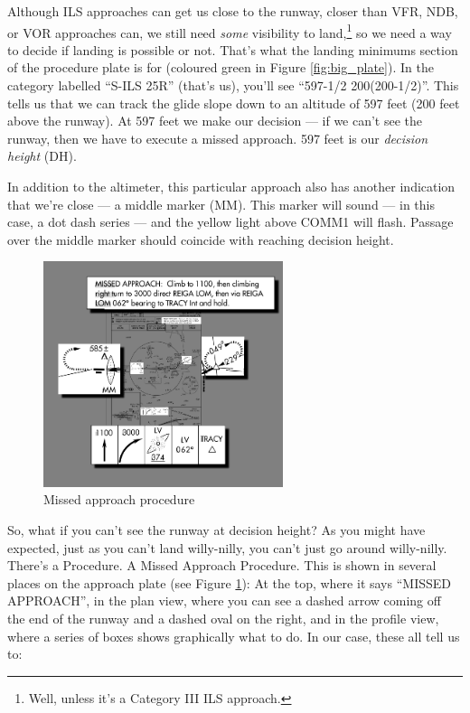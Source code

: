 Although ILS approaches can get us close to the runway, closer than
VFR, NDB, or VOR approaches can, we still need \emph{some} visibility
to land,\footnote{Well, unless it's a Category III ILS approach.} so
we need a way to decide if landing is possible or not.  That's what
the landing minimums section of the procedure plate is for (coloured
green in Figure \ref{fig:big_plate}).  In the category labelled
``S-ILS 25R'' (that's us), you'll see ``597-1/2 200(200-1/2)''.  This
tells us that we can track the glide slope down to an altitude of 597
feet (200 feet above the runway).  At 597 feet we make our decision
--- if we can't see the runway, then we have to execute a missed
approach.  597 feet is our \emph{decision height} (DH).

In addition to the altimeter, this particular approach also has
another indication that we're close --- a middle marker (MM).  This
marker will sound --- in this case, a dot dash series --- and the
yellow light above COMM1 will flash.  Passage over the middle marker
should coincide with reaching decision height.

\begin{figure}
  \begin{center}
    \includegraphics[width=7cm]{img/MAP.png}
    \caption{Missed approach procedure}
    \label{map}
  \end{center}
\end{figure}

So, what if you can't see the runway at decision height?  As you might
have expected, just as you can't land willy-nilly, you can't just go
around willy-nilly.  There's a Procedure.  A Missed Approach
Procedure.  This is shown in several places on the approach plate (see
Figure \ref{map}): At the top, where it says ``MISSED APPROACH'',
in the plan view, where you can see a dashed arrow coming off the end
of the runway and a dashed oval on the right, and in the profile view,
where a series of boxes shows graphically what to do.  In our case,
these all tell us to:

